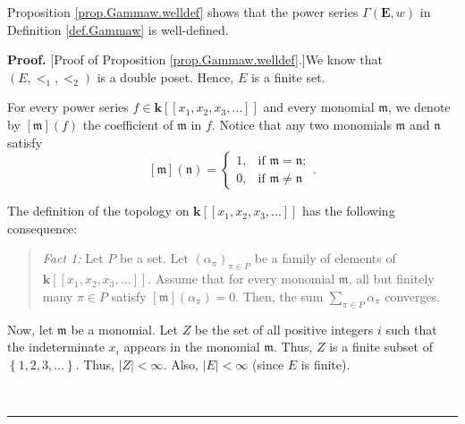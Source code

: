 \documentclass[numbers=enddot,12pt,final,onecolumn,notitlepage,abstracton]{scrartcl}
\theoremstyle{definition}
\newenvironment{statement}{\begin{quote}}{\end{quote}}
\newenvironment{proof}[1][Proof]{\noindent\textbf{#1.} }{\ \rule{0.5em}{0.5em}}
\let\sumnonlimits\sum
\renewcommand{\sum}{\sumnonlimits\limits}
\newenvironment{verlong}{}{}
\begin{document}
\begin{verlong}
\begin{footnotesize}
Proposition \ref{prop.Gammaw.welldef} shows that the power series
$\Gamma\left(  {\mathbf{E}},w\right)  $ in Definition \ref{def.Gammaw} is well-defined.

\begin{proof}
[Proof of Proposition \ref{prop.Gammaw.welldef}.]We know that $\left(
E,<_{1},<_{2}\right)  $ is a double poset. Hence, $E$ is a finite set.

For every power series $f\in\mathbf{k}\left[  \left[  x_{1},x_{2},x_{3}%
,\ldots\right]  \right]  $ and every monomial $\mathfrak{m}$, we denote by
$\left[  \mathfrak{m}\right]  \left(  f\right)  $ the coefficient of
$\mathfrak{m}$ in $f$. Notice that any two monomials $\mathfrak{m}$ and
$\mathfrak{n}$ satisfy%
\begin{equation}
\left[  \mathfrak{m}\right]  \left(  \mathfrak{n}\right)  =%
\begin{cases}
1, & \text{if }\mathfrak{m}=\mathfrak{n};\\
0, & \text{if }\mathfrak{m}\neq\mathfrak{n}%
\end{cases}
. \label{pf.prop.Gammaw.welldef.mn}%
\end{equation}


The definition of the topology on $\mathbf{k}\left[  \left[  x_{1},x_{2}%
,x_{3},\ldots\right]  \right]  $ has the following consequence:

\begin{statement}
\textit{Fact 1:} Let $P$ be a set. Let $\left(  \alpha_{\pi}\right)  _{\pi\in
P}$ be a family of elements of $\mathbf{k}\left[  \left[  x_{1},x_{2}%
,x_{3},\ldots\right]  \right]  $. Assume that for every monomial
$\mathfrak{m}$, all but finitely many $\pi\in P$ satisfy $\left[
\mathfrak{m}\right]  \left(  \alpha_{\pi}\right)  =0$. Then, the sum
$\sum_{\pi\in P}\alpha_{\pi}$ converges.
\end{statement}

Now, let $\mathfrak{m}$ be a monomial. Let $Z$ be the set of all positive
integers $i$ such that the indeterminate $x_{i}$ appears in the monomial
$\mathfrak{m}$. Thus, $Z$ is a finite subset of $\left\{  1,2,3,\ldots
\right\}  $. Thus, $\left\vert Z\right\vert <\infty$. Also, $\left\vert
E\right\vert <\infty$ (since $E$ is finite).


\end{proof}
\end{footnotesize}
\end{verlong}
\end{document}
